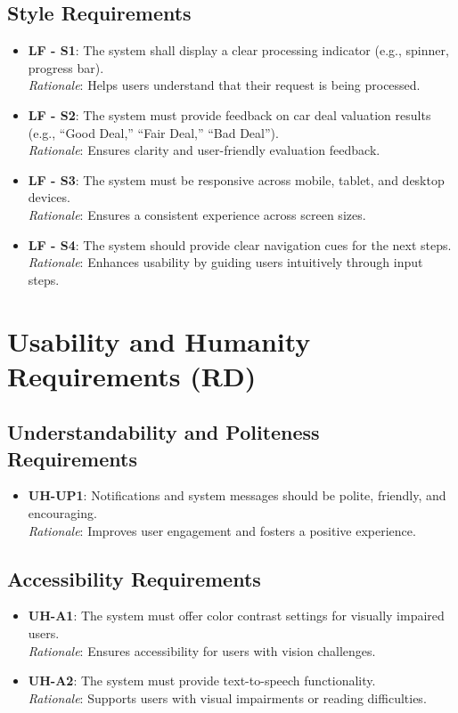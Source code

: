\documentclass[]{article}
\begin{document}
\subsection{Style Requirements}
\begin{itemize}
    \item \textbf{LF - S1}: The system shall display a clear processing indicator (e.g., spinner, progress bar). \\ 
    \textit{Rationale}: Helps users understand that their request is being processed.
    
    \item \textbf{LF - S2}: The system must provide feedback on car deal valuation results (e.g., “Good Deal,” “Fair Deal,” “Bad Deal”). \\ 
    \textit{Rationale}: Ensures clarity and user-friendly evaluation feedback.
    
    \item \textbf{LF - S3}: The system must be responsive across mobile, tablet, and desktop devices. \\ 
    \textit{Rationale}: Ensures a consistent experience across screen sizes.
    
    \item \textbf{LF - S4}: The system should provide clear navigation cues for the next steps. \\ 
    \textit{Rationale}: Enhances usability by guiding users intuitively through input steps.
\end{itemize}

\section{Usability and Humanity Requirements (RD)}
\subsection{Understandability and Politeness Requirements}
\begin{itemize}
    \item \textbf{UH-UP1}: Notifications and system messages should be polite, friendly, and encouraging. \\ 
    \textit{Rationale}: Improves user engagement and fosters a positive experience.
\end{itemize}

\subsection{Accessibility Requirements}
\begin{itemize}
    \item \textbf{UH-A1}: The system must offer color contrast settings for visually impaired users. \\ 
    \textit{Rationale}: Ensures accessibility for users with vision challenges.
    
    \item \textbf{UH-A2}: The system must provide text-to-speech functionality. \\ 
    \textit{Rationale}: Supports users with visual impairments or reading difficulties.
\end{itemize}
\end{document}
